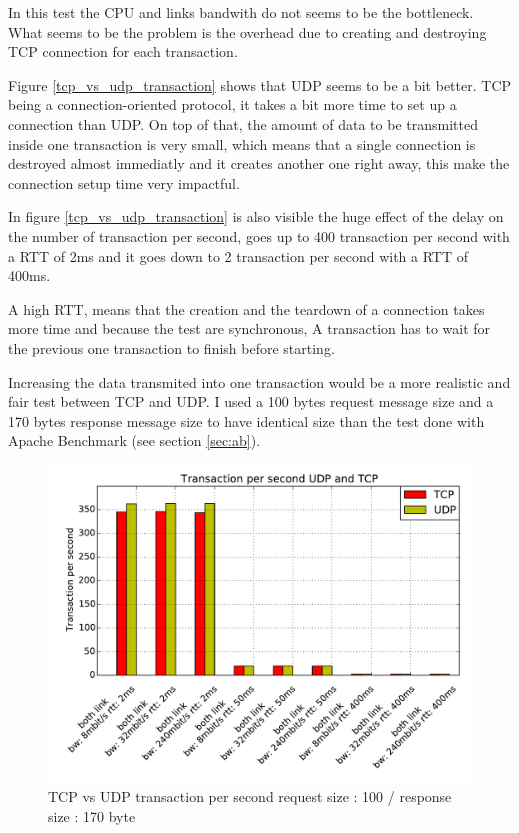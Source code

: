   In this test the CPU and links bandwith do not seems to be the bottleneck. What seems to be the problem is the overhead due to creating and destroying TCP connection for each transaction.

  Figure \ref{tcp_vs_udp_transaction} shows that UDP seems to be a bit better. TCP being a connection-oriented protocol, it takes a bit more time to set up a connection than UDP.
  On top of that, the amount of data to be transmitted inside one transaction is very small, which means that a single connection is destroyed almost immediatly and it creates another one right away,
  this make the connection setup time very impactful.

  In figure \ref{tcp_vs_udp_transaction} is also visible the huge effect of the delay on the number of transaction per second,
  goes up to 400 transaction per second with a RTT of 2ms and it goes down to 2 transaction per second with a RTT of 400ms.

  A high RTT, means that the creation and the teardown of a connection takes more time and because the test are synchronous,
  A transaction has to wait for the previous one transaction to finish before starting.

  Increasing the data transmited into one transaction would be a more realistic and fair test between TCP and UDP.
  I used a 100 bytes request message size and a 170 bytes response message size to have identical size than the test done with Apache Benchmark (see section \ref{sec:ab}).

  \begin{figure}[h!]
    \centering
    \includegraphics[width=16cm]{../results/tcp_vs_udp_transaction_fair.pdf}
    \caption{TCP vs UDP transaction per second request size : 100 / response size : 170 byte}
    \label{tcp_vs_udp_transaction_fair}
  \end{figure}

